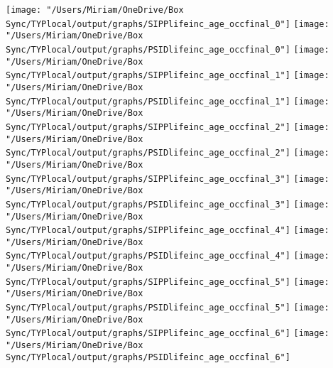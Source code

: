 \documentclass[11pt]{article}
\begin{document}
\begin{center}
\clearpage
\texttt{[image: "/Users/Miriam/OneDrive/Box Sync/TYPlocal/output/graphs/SIPPlifeinc\_age\_occfinal\_0"]}
\newline
\texttt{[image: "/Users/Miriam/OneDrive/Box Sync/TYPlocal/output/graphs/PSIDlifeinc\_age\_occfinal\_0"]}
\clearpage
\texttt{[image: "/Users/Miriam/OneDrive/Box Sync/TYPlocal/output/graphs/SIPPlifeinc\_age\_occfinal\_1"]}
\newline
\texttt{[image: "/Users/Miriam/OneDrive/Box Sync/TYPlocal/output/graphs/PSIDlifeinc\_age\_occfinal\_1"]}
\clearpage
\texttt{[image: "/Users/Miriam/OneDrive/Box Sync/TYPlocal/output/graphs/SIPPlifeinc\_age\_occfinal\_2"]}
\newline
\texttt{[image: "/Users/Miriam/OneDrive/Box Sync/TYPlocal/output/graphs/PSIDlifeinc\_age\_occfinal\_2"]}
\clearpage
\texttt{[image: "/Users/Miriam/OneDrive/Box Sync/TYPlocal/output/graphs/SIPPlifeinc\_age\_occfinal\_3"]}
\newline
\texttt{[image: "/Users/Miriam/OneDrive/Box Sync/TYPlocal/output/graphs/PSIDlifeinc\_age\_occfinal\_3"]}
\clearpage
\texttt{[image: "/Users/Miriam/OneDrive/Box Sync/TYPlocal/output/graphs/SIPPlifeinc\_age\_occfinal\_4"]}
\newline
\texttt{[image: "/Users/Miriam/OneDrive/Box Sync/TYPlocal/output/graphs/PSIDlifeinc\_age\_occfinal\_4"]}
\clearpage
\texttt{[image: "/Users/Miriam/OneDrive/Box Sync/TYPlocal/output/graphs/SIPPlifeinc\_age\_occfinal\_5"]}
\newline
\texttt{[image: "/Users/Miriam/OneDrive/Box Sync/TYPlocal/output/graphs/PSIDlifeinc\_age\_occfinal\_5"]}
\clearpage
\texttt{[image: "/Users/Miriam/OneDrive/Box Sync/TYPlocal/output/graphs/SIPPlifeinc\_age\_occfinal\_6"]}
\newline
\texttt{[image: "/Users/Miriam/OneDrive/Box Sync/TYPlocal/output/graphs/PSIDlifeinc\_age\_occfinal\_6"]}
\clearpage
\end{center}
\end{document}

